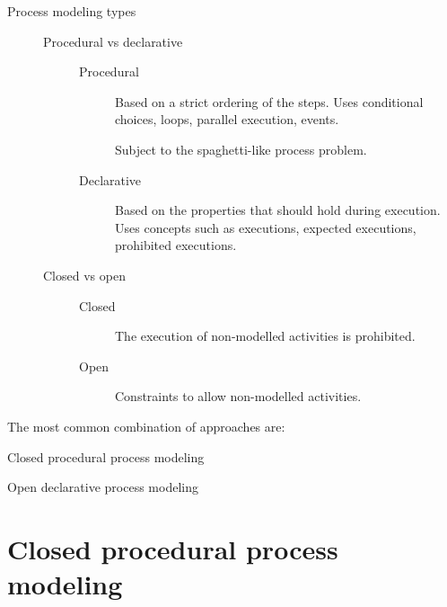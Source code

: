 \begin{description}
    \item[Process modeling types] \phantom{}
        \begin{description}
            \item[Procedural vs declarative] \phantom{}
                \begin{description}
                    \item[Procedural] 
                        Based on a strict ordering of the steps.
                        Uses conditional choices, loops, parallel execution, events. 

                        Subject to the spaghetti-like process problem.

                    \item[Declarative] 
                        Based on the properties that should hold during execution.
                        Uses concepts such as executions, expected executions, prohibited executions.
                \end{description}

            \item[Closed vs open] \phantom{}
                \begin{description}
                    \item[Closed] 
                        The execution of non-modelled activities is prohibited.
                    
                    \item[Open] 
                        Constraints to allow non-modelled activities.
                \end{description}
        \end{description}
\end{description}

The most common combination of approaches are:
\begin{descriptionlist}
    \item[Closed procedural process modeling] 
    \item[Open declarative process modeling] 
\end{descriptionlist}



\section{Closed procedural process modeling}


